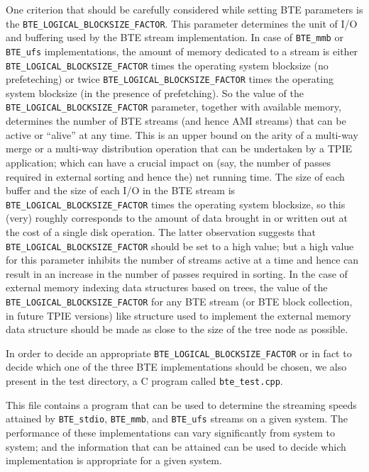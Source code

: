 One criterion that should be carefully considered while setting BTE 
parameters is the \verb|BTE_LOGICAL_BLOCKSIZE_FACTOR|. This parameter
determines the unit of I/O and buffering used by the BTE stream
implementation. In case of \verb|BTE_mmb| or \verb|BTE_ufs|
implementations,  the amount of memory dedicated to a stream is 
either \verb|BTE_LOGICAL_BLOCKSIZE_FACTOR| times the operating system 
blocksize (no prefeteching) or twice  
\verb|BTE_LOGICAL_BLOCKSIZE_FACTOR| times the operating system  blocksize
(in the presence of prefetching). So the value of the
\verb|BTE_LOGICAL_BLOCKSIZE_FACTOR| parameter, together with available
memory, determines the number of BTE streams (and hence AMI streams)
that can be active or ``alive'' at any time. This is an upper bound on
the arity of a multi-way merge or a multi-way distribution operation
that can be undertaken by a TPIE application; which can have a crucial
impact on (say, the number of passes required in external sorting and
hence the) net running time. The size of each buffer and the size of
each I/O in the BTE stream is \verb|BTE_LOGICAL_BLOCKSIZE_FACTOR|
times the operating system  blocksize, so this (very) roughly
corresponds to the amount of data brought in or written out at the
cost of a single disk operation.  The latter observation suggests
that \verb|BTE_LOGICAL_BLOCKSIZE_FACTOR| should be set to a high
value; but a high value for this parameter inhibits the number of 
streams active at a time and hence can result in an increase in the
number of passes required in sorting. In the case of external memory
indexing data structures based on trees, the value of the 
\verb|BTE_LOGICAL_BLOCKSIZE_FACTOR| for any BTE stream (or BTE block
collection, in future TPIE versions) like structure used to implement 
the external memory data structure should be made as close to the size
of the tree node as possible.

In order to decide an appropriate \verb|BTE_LOGICAL_BLOCKSIZE_FACTOR|
or in fact to decide which one of the three BTE implementations 
should be chosen, we also present in the test directory, a C program
called \verb|bte_test.cpp|.
  

This file contains a program that can be used to determine the 
streaming speeds attained by \verb|BTE_stdio|, \verb|BTE_mmb|, and
\verb|BTE_ufs| 
streams on a given system. The performance of these implementations
can vary significantly from system to system; and the information 
that can be attained  can be used to decide which implementation
is appropriate for a given system. 

